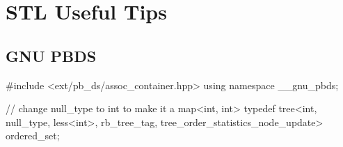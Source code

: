 \section{STL Useful Tips}

\subsection{GNU PBDS}
\begin{cppcode}
	#include <ext/pb_ds/assoc_container.hpp>
	using namespace __gnu_pbds;

	// change null_type to int to make it a map<int, int>
	typedef tree<int, null_type, less<int>, rb_tree_tag, tree_order_statistics_node_update> ordered_set;
\end{cppcode}